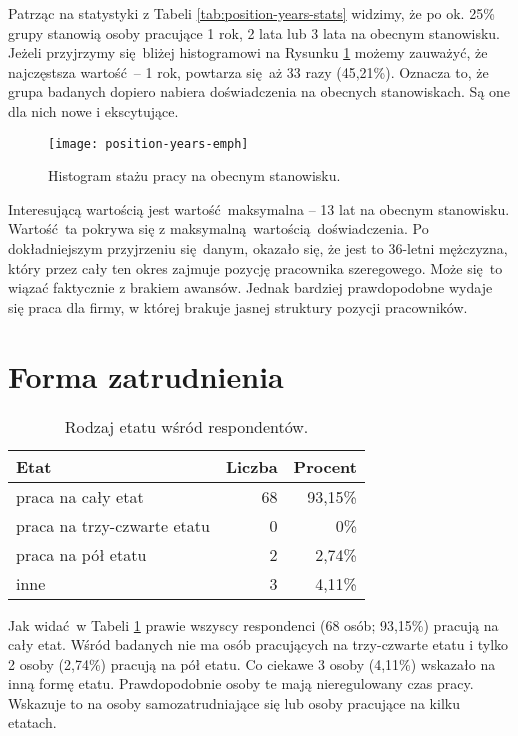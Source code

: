 Patrząc na statystyki z Tabeli \ref{tab:position-years-stats} widzimy, że po ok. 25\% grupy stanowią osoby pracujące 1 rok, 2 lata lub 3 lata na obecnym stanowisku. Jeżeli przyjrzymy się bliżej histogramowi na Rysunku \ref{fig:position-years} możemy zauważyć, że najczęstsza wartość -- 1 rok, powtarza się aż 33 razy (45,21\%). Oznacza to, że grupa badanych dopiero nabiera doświadczenia na obecnych stanowiskach. Są one dla nich nowe i ekscytujące.

\begin{figure}[h]
\begin{center}
\texttt{[image: position-years-emph]}
\end{center}
\caption{Histogram stażu pracy na obecnym stanowisku.}
\label{fig:position-years}
\end{figure}

Interesującą wartością jest wartość maksymalna -- 13 lat na obecnym stanowisku. Wartość ta pokrywa się z maksymalną wartością doświadczenia. Po dokładniejszym przyjrzeniu się danym, okazało się, że jest to 36-letni mężczyzna, który przez cały ten okres zajmuje pozycję pracownika szeregowego. Może się to wiązać faktycznie z brakiem awansów. Jednak bardziej prawdopodobne wydaje się praca dla firmy, w której brakuje jasnej struktury pozycji pracowników.

\section{Forma zatrudnienia}

\begin{table}[h!]
\begin{center}
\begin{tabular}{l r r}
Etat & Liczba & Procent \\ \hline
praca na cały etat & 68 & 93,15\% \\
praca na trzy-czwarte etatu & 0 & 0\% \\
praca na pół etatu & 2 & 2,74\% \\
inne & 3 & 4,11\% \\
\end{tabular}
\end{center}
\caption{Rodzaj etatu wśród respondentów.}
\label{tab:work-time-stats}
\end{table}

Jak widać w Tabeli \ref{tab:work-time-stats} prawie wszyscy respondenci (68 osób; 93,15\%) pracują na cały etat. Wśród badanych nie ma osób pracujących na trzy-czwarte etatu i tylko 2 osoby (2,74\%) pracują na pół etatu. Co ciekawe 3 osoby (4,11\%) wskazało na inną formę etatu. Prawdopodobnie osoby te mają nieregulowany czas pracy. Wskazuje to na osoby samozatrudniające się lub osoby pracujące na kilku etatach.

